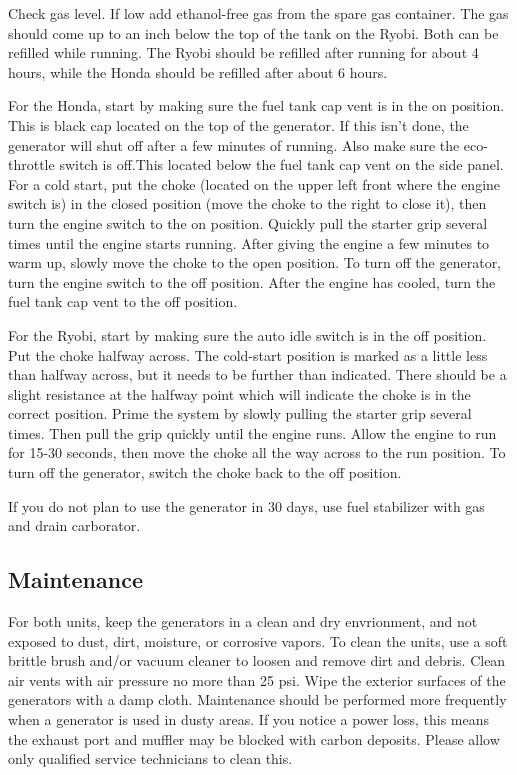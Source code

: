 \documentclass[12pt]{../SOP3_beta}
\begin{document}
\NP Check gas level. If low add ethanol-free gas from the spare gas container. The gas should come up to an inch below the top of the tank on the Ryobi. Both can be refilled while running. The Ryobi should be refilled after running for about 4 hours, while the Honda should be refilled after about 6 hours. 

\NP For the Honda, start by making sure the fuel tank cap vent is in the on position. This is black cap located on the top of the generator. If this isn't done, the generator will shut off after a few minutes of running. Also make sure the eco-throttle switch is off.This located below the fuel tank cap vent on the side panel. For a cold start, put the choke (located on the upper left front where the engine switch is) in the closed position (move the choke to the right to close it), then turn the engine switch to the on position. 
  Quickly pull the starter grip several times until the engine starts running. After giving the engine a few minutes to warm up, slowly move the choke to the open position.
  To turn off the generator, turn the engine switch to the off position. After the engine has cooled, turn the fuel tank cap vent to the off position. 

\NP For the Ryobi, start by making sure the auto idle switch is in the off position. Put the choke halfway across. The cold-start position is marked as a little less than halfway across, but it needs to be further than indicated. There should be a slight resistance at the halfway point which will indicate the choke is in the correct position.
  Prime the system by slowly pulling the starter grip several times. Then pull the grip quickly until the engine runs. Allow the engine to run for 15-30 seconds, then move the choke all the way across to the run position.
  To turn off the generator, switch the choke back to the off position.

\NP If you do not plan to use the generator in 30 days, use fuel stabilizer with gas and drain carborator. 

\subsection{Maintenance}

\NP For both units, keep the generators in a clean and dry envrionment, and not exposed to dust, dirt, moisture, or corrosive vapors. To clean the units, use a soft brittle brush and/or vacuum cleaner to loosen and remove dirt and debris. Clean air vents with air pressure no more than 25 psi. Wipe the exterior surfaces of the generators with a damp cloth. Maintenance should be performed more frequently when a generator is used in dusty areas. If you notice a power loss, this means the exhaust port and muffler may be blocked with carbon deposits. Please allow only qualified service technicians to clean this.
\end{document}
